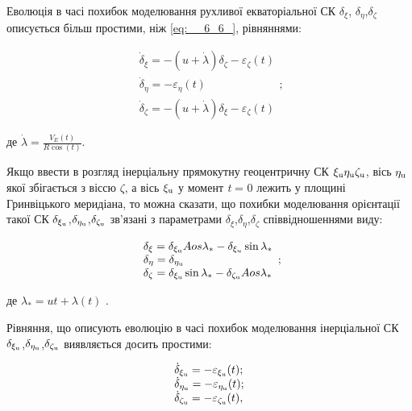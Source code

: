Еволюція в часі похибок моделювання рухливої екваторіальної СК $\delta _{\xi } $, $\delta 
_{\eta } $,$\delta _{\zeta } $ описується більш простими, ніж \eqref{eq:__6_6_}, 
рівняннями:

\[\begin{array}{l} {\dot{\delta }_{\xi } =-(u+\dot{\lambda })\delta _{\zeta } -\varepsilon 
_{\zeta } (t)} \\ {\dot{\delta }_{\eta } =-\varepsilon _{\eta } (t)} \\ {\dot{\delta 
}_{\zeta } =-(u+\dot{\lambda })\delta _{\xi } -\varepsilon _{\zeta } (t)} \end{array};\] 

де $\dot{
\lambda }=\frac{V_{E} (t)}{R\cos (t)} $.

Якщо ввести в розгляд  інерціальну прямокутну геоцентричну СК $\xi _{{\rm u}} \eta 
_{{\rm u}} \zeta _{{\rm u}} $, вісь $\eta _{{\rm u}} $ якої збігається з віссю $\zeta $, 
а вісь $\xi _{{\rm u}} $ у момент  \textit{t }= 0 лежить у площині Гринвіцького меридіана, 
то можна сказати, що похибки моделювання орієнтації такої СК $\delta _{\xi _{{\rm 
u}} } $,$\delta _{\eta _{{\rm u}} } $,$\delta _{\zeta _{{\rm u}} } $ зв'язані з параметрами $\delta 
_{\xi } $,$\delta _{\eta } $,$\delta _{\zeta } $ співвідношеннями виду:

\[\begin{array}{l} {\delta _{\xi } =\delta _{\xi _{{\rm u}} } Aos\lambda _{*} -\delta 
_{\xi _{u} } \sin \lambda _{*} } \\ {\delta _{\eta } =\delta _{\eta _{{\rm u}} } 
} \\ {\delta _{\zeta } =\delta _{\xi _{{\rm u}} } \sin \lambda _{*} -\delta _{\zeta 
_{{\rm u}} } Aos\lambda _{*} } \end{array};\] 

де  $\lambda _{*} =ut+\lambda (t)$ .

Рівняння, що описують еволюцію в часі похибок моделювання інерціальної СК $\delta 
_{\xi _{{\rm u}} } $,$\delta _{\eta _{{\rm u}} } $,$\delta _{\zeta _{{\rm u}} } $ виявляється 
досить простими:

\[\begin{array}{l} {\dot{\delta }_{\xi _{{\rm u}} } =-\varepsilon _{\xi _{{\rm u}} 
} (t);} \\ {\dot{\delta }_{\eta _{{\rm u}} } =-\varepsilon _{\eta _{{\rm u}} } (t);} 
\\ {\dot{\delta }_{\zeta _{{\rm u}} } =-\varepsilon _{\zeta _{{\rm u}} } (t),} \end{array}\] 

